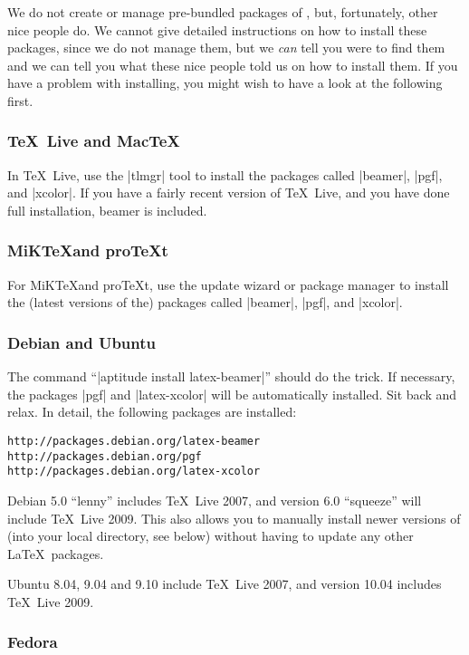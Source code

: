 We do not create or manage pre-bundled packages of \beamer, but, fortunately, other nice people do. We cannot give detailed instructions on how to install these packages, since we do not manage them, but we \emph{can} tell you were to find them and we can tell you what these nice people told us on how to install them. If you have a problem with installing, you might wish to have a look at the following first.


\subsubsection{\TeX\ Live and Mac\TeX}

In \TeX\ Live, use the |tlmgr| tool to install the packages called |beamer|, |pgf|, and |xcolor|. If you have a fairly recent version of \TeX\ Live, and you have done full installation, beamer is included.

\subsubsection{MiK\TeX and pro\TeX t}

For MiK\TeX and pro\TeX t, use the update wizard or package manager to install the (latest versions of the) packages called |beamer|, |pgf|, and |xcolor|.

\subsubsection{Debian and Ubuntu}

The command ``|aptitude install latex-beamer|'' should do the trick. If necessary, the packages |pgf| and |latex-xcolor| will be automatically installed. Sit back and relax. In detail, the following packages are installed:
\begin{verbatim}
http://packages.debian.org/latex-beamer
http://packages.debian.org/pgf
http://packages.debian.org/latex-xcolor
\end{verbatim}
Debian 5.0 ``lenny'' includes \TeX\ Live 2007, and version 6.0 ``squeeze'' will include \TeX\ Live 2009. This also allows you to manually install newer versions of \beamer (into your local directory, see below) without having to update any other \LaTeX\ packages.

Ubuntu 8.04, 9.04 and 9.10 include \TeX\ Live 2007, and version 10.04 includes \TeX\ Live 2009.

\subsubsection{Fedora}

